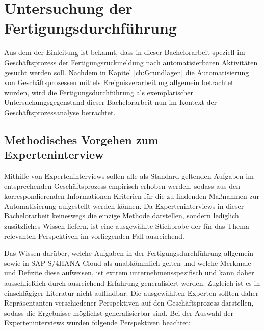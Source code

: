 \section{Untersuchung der Fertigungsdurchführung}\label{sec:untersuchung}


Aus dem der Einleitung ist bekannt, dass in dieser Bachelorarbeit speziell im Geschäftsprozess der Fertigungsrückmeldung nach automatisierbaren Aktivitäten gesucht werden soll. 
Nachdem in Kapitel \ref{ch:Grundlagen} die Automatisierung von Geschäftsprozessen mittels Ereignisverarbeitung allgemein betrachtet wurden, wird die Fertigungsdurchführung als exemplarischer Untersuchungsgegenstand dieser Bachelorarbeit nun im Kontext der Geschäftsprozessanalyse betrachtet. 

\subsection{Methodisches Vorgehen zum Experteninterview}

Mithilfe von Experteninterviews sollen alle als Standard geltenden Aufgaben im entsprechenden Geschäftsprozess empirisch erhoben werden, sodass aus den korrespondierenden Informationen Kriterien für die zu findenden Maßnahmen zur Automatisierung aufgestellt werden können. 
Da Experteninterviews in dieser Bachelorarbeit keineswegs die einzige Methode darstellen, sondern lediglich zusätzliches Wissen liefern, ist eine ausgewählte Stichprobe der für das Thema relevanten Perspektiven im vorliegenden Fall ausreichend.

Das Wissen darüber, welche Aufgaben in der Fertigungsdurchführung allgemein sowie in SAP S/4HANA Cloud als unabkömmlich gelten und welche Merkmale und Defizite diese aufweisen, ist extrem unternehmensspezifisch und kann daher ausschließlich durch ausreichend Erfahrung generalisiert werden. 
Zugleich ist es in einschlägiger Literatur nicht auffindbar.
Die ausgewählten Experten sollten daher Repräsentanten verschiedener Perspektiven auf den Geschäftsprozess darstellen, sodass die Ergebnisse möglichst generalisierbar sind. 
Bei der Auswahl der Experteninterviews wurden folgende Perspektiven beachtet:

